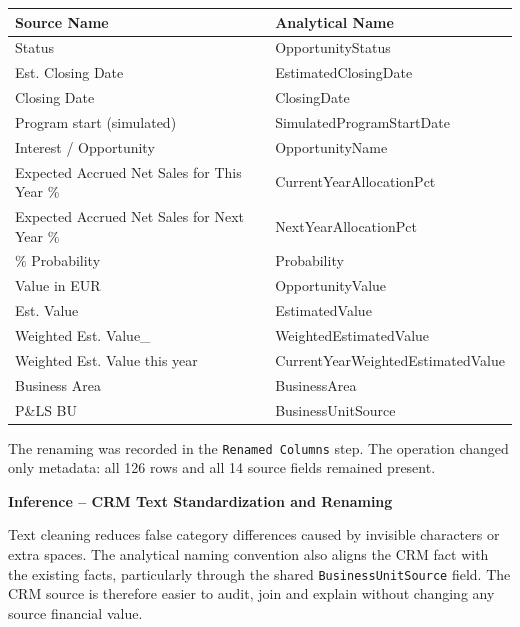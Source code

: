 \documentclass[11pt,a4paper]{article}
\begin{document}
\begin{tabularx}{\textwidth}{
    >{\ttfamily}p{7.1cm}
    >{\ttfamily}X
}

\toprule

Source Name
&
Analytical Name
\\

\midrule

Status
&
OpportunityStatus
\\

Est. Closing Date
&
EstimatedClosingDate
\\

Closing Date
&
ClosingDate
\\

Program start (simulated)
&
SimulatedProgramStartDate
\\

Interest / Opportunity
&
OpportunityName
\\

Expected Accrued Net Sales for This Year \%
&
CurrentYearAllocationPct
\\

Expected Accrued Net Sales for Next Year \%
&
NextYearAllocationPct
\\

\% Probability
&
Probability
\\

Value in EUR
&
OpportunityValue
\\

Est. Value
&
EstimatedValue
\\

Weighted Est. Value\_
&
WeightedEstimatedValue
\\

Weighted Est. Value this year
&
CurrentYearWeightedEstimatedValue
\\

Business Area
&
BusinessArea
\\

P\&LS BU
&
BusinessUnitSource
\\

\bottomrule

\end{tabularx}

The renaming was recorded in the \texttt{Renamed Columns} step. The operation
changed only metadata: all 126 rows and all 14 source fields remained present.

\begin{inferencebox}

\textbf{Inference -- CRM Text Standardization and Renaming}

Text cleaning reduces false category differences caused by invisible characters
or extra spaces. The analytical naming convention also aligns the CRM fact with
the existing facts, particularly through the shared
\texttt{BusinessUnitSource} field. The CRM source is therefore easier to audit,
join and explain without changing any source financial value.

\end{inferencebox}
\end{document}
